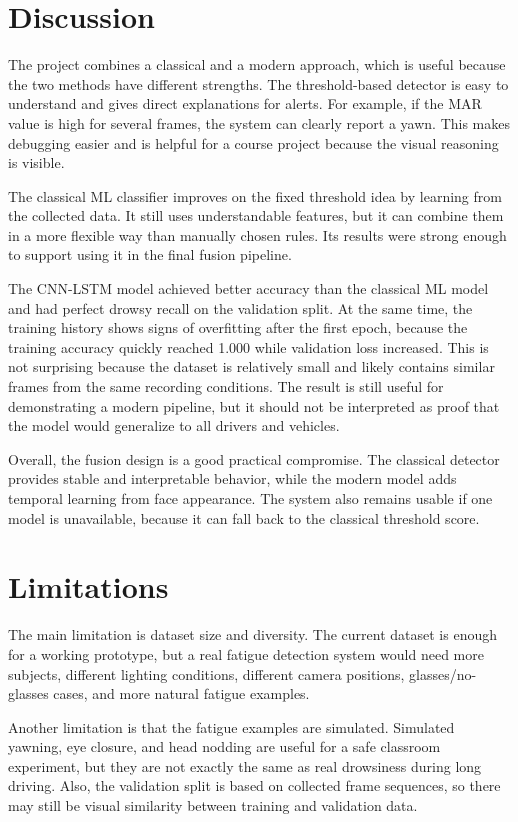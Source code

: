 \documentclass[conference]{IEEEtran}
\begin{document}
\section{Discussion}

The project combines a classical and a modern approach, which is useful because the two methods have different strengths. The threshold-based detector is easy to understand and gives direct explanations for alerts. For example, if the MAR value is high for several frames, the system can clearly report a yawn. This makes debugging easier and is helpful for a course project because the visual reasoning is visible.

The classical ML classifier improves on the fixed threshold idea by learning from the collected data. It still uses understandable features, but it can combine them in a more flexible way than manually chosen rules. Its results were strong enough to support using it in the final fusion pipeline.

The CNN-LSTM model achieved better accuracy than the classical ML model and had perfect drowsy recall on the validation split. At the same time, the training history shows signs of overfitting after the first epoch, because the training accuracy quickly reached 1.000 while validation loss increased. This is not surprising because the dataset is relatively small and likely contains similar frames from the same recording conditions. The result is still useful for demonstrating a modern pipeline, but it should not be interpreted as proof that the model would generalize to all drivers and vehicles.

Overall, the fusion design is a good practical compromise. The classical detector provides stable and interpretable behavior, while the modern model adds temporal learning from face appearance. The system also remains usable if one model is unavailable, because it can fall back to the classical threshold score.

\section{Limitations}

The main limitation is dataset size and diversity. The current dataset is enough for a working prototype, but a real fatigue detection system would need more subjects, different lighting conditions, different camera positions, glasses/no-glasses cases, and more natural fatigue examples.

Another limitation is that the fatigue examples are simulated. Simulated yawning, eye closure, and head nodding are useful for a safe classroom experiment, but they are not exactly the same as real drowsiness during long driving. Also, the validation split is based on collected frame sequences, so there may still be visual similarity between training and validation data.
\end{document}
